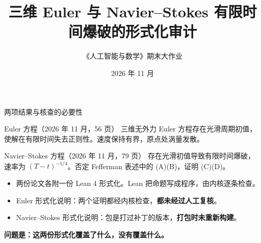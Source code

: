 \documentclass[aspectratio=169,11pt,fontset=windows]{ctexbeamer}
\title[形式化审计]{三维 Euler 与 Navier--Stokes 有限时间爆破的形式化审计}
\author{《人工智能与数学》期末大作业}
\institute{阶段性进展汇报}
\date{2026 年 11 月}
\begin{document}
\begin{frame}
  \titlepage
\end{frame}

\begin{frame}{两项结果与核查的必要性}
  \small
  \begin{block}{Euler 方程（2026 年 11 月，56 页）}
    \footnotesize
    三维无外力 Euler 方程存在光滑周期初值，使解在有限时间失去正则性。速度保持有界，原点处涡量发散。
  \end{block}
  \begin{block}{Navier--Stokes 方程（2026 年 11 月，79 页）}
    \footnotesize
    存在光滑初值导致有限时间爆破，速率为 $(T-t)^{-1/4}$。否定 Fefferman 表述中的 (A)(B)，证明 (C)(D)。
  \end{block}

  \vspace{2mm}
  \begin{itemize}
    \setlength{\itemsep}{2pt}
    \item 两份论文各附一份 Lean 4 形式化。Lean 把命题写成程序，由内核逐条检查。
    \item Euler 形式化说明：两个证明都经内核检查，\textbf{都未经过人工复核}。
    \item Navier--Stokes 形式化说明：包是打过补丁的版本，\textbf{打包时未重新构建}。
  \end{itemize}

  \vspace{2mm}
  \centering
  \textbf{问题是：这两份形式化覆盖了什么，没有覆盖什么。}
\end{frame}
\end{document}
